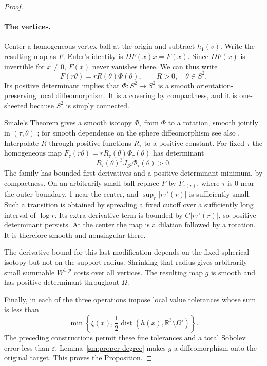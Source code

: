 \documentclass[11pt]{article}
\numberwithin{equation}{section}
\theoremstyle{definition}
\theoremstyle{remark}
\newcommand{\R}{\mathbb R}
\newcommand{\eps}{\varepsilon}
\DeclareMathOperator{\dist}{dist}
\begin{document}
\begin{proof}
\paragraph{The vertices.}
Center a homogeneous vertex ball at the origin and subtract
$h_1(v)$.  Write the resulting map as $F$.  Euler's identity is
$DF(x)x=F(x)$.  Since $DF(x)$ is invertible for $x\ne0$, $F(x)$
never vanishes there.  We can thus write
\begin{equation}
 \label{sm:vertex-form}
 F(r\theta)=rR(\theta)\Phi(\theta),\qquad
 R>0,\quad\theta\in S^2.
\end{equation}
Its positive determinant implies that $\Phi:S^2\to S^2$ is a
smooth orientation-preserving local diffeomorphism.  It is a
covering by compactness, and it is one-sheeted because $S^2$ is
simply connected.

Smale's Theorem gives a smooth isotopy $\Phi_\tau$ from $\Phi$
to a rotation, smooth jointly in $(\tau,\theta)$
\cite[Theorem~6]{Smale1959}; for smooth dependence on the sphere
diffeomorphism see also
\cite[Theorem~1.5]{LiWatts2011}.  Interpolate $R$ through positive
functions $R_\tau$ to a positive constant.  For fixed $\tau$ the
homogeneous map
$F_\tau(r\theta)=rR_\tau(\theta)\Phi_\tau(\theta)$
has determinant
\[
 R_\tau(\theta)^3 J_{S^2}\Phi_\tau(\theta)>0.
\]
The family has bounded first derivatives and a positive
determinant minimum, by compactness.  On an arbitrarily small
ball replace $F$ by $F_{\tau(r)}$, where $\tau$ is 0 near the
outer boundary, 1 near the center, and
$\sup_r|r\tau'(r)|$ is sufficiently small.  Such a transition
is obtained by spreading a fixed cutoff over a sufficiently
long interval of $\log r$.  Its extra derivative term is
bounded by $C|r\tau'(r)|$, so positive determinant persists.
At the center the map is a dilation followed by a rotation.
It is therefore smooth and nonsingular there.

The derivative bound for this last modification depends on the
fixed spherical isotopy but not on the support radius.  Shrinking
that radius gives arbitrarily small summable $W^{1,p}$ costs
over all vertices.  The resulting map $g$ is smooth and has
positive determinant throughout $\Omega$.

Finally, in each of the three operations impose local value
tolerances whose sum is less than
\[
 \min\!\left\{\xi(x),\frac12
 \dist(h(x),\R^3\setminus\Omega')\right\}.
\]
The preceding constructions permit these fine tolerances and a
total Sobolev error less than $\eps$.  Lemma~\ref{sm:proper-degree}
makes $g$ a diffeomorphism onto the original target.  This proves
the Proposition.
\end{proof}
\end{document}

